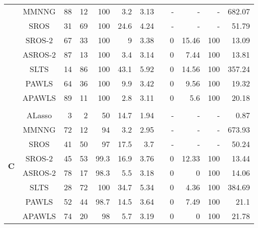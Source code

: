 \documentclass{article}\usepackage[]{graphicx}\usepackage[]{color}
\begin{document}
\begin{table}[thp]
\begin{center}
\begin{tabular}{ccrrrrrrrrrr}
	      & MMNNG & 88 & 12 & 100 
	      & 3.2 & 3.13 & & -& - & - & 682.07\\
	      
	      & SROS & 31 & 69 & 100 
	      & 24.6 & 4.24 & & -& - & - &  51.79\\
	      
	       & SROS-2 & 67 & 33 & 100 
	      & 9 & 3.38 & & 0 
	      & 15.46 & 100 & 13.09\\
	      
	      & ASROS-2 & 87 & 13 & 100 
	      & 3.4 & 3.14 & & 0 
	      & 7.44 & 100 & 13.81\\
	      
	      
	       & SLTS & 14 & 86 & 100 
	      & 43.1 & 5.92 & & 0 
	      & 14.56 & 100 & 357.24\\
	      
	      & PAWLS & 64 & 36 & 100 
	      & 9.9 & 3.42 & & 0 
	      & 9.56 & 100 & 19.32\\
	      
	      & APAWLS & 89 & 11 & 100 
	      & 2.8 & 3.11 & & 0 
	      & 5.6 & 100 & 20.18\\
	      \\
	        	  \multirow{8}{*}{{\bf C}}
	     	      & ALasso & 3 & 2 & 50 
	      & 14.7 & 1.94 & & -& - & - &  0.87\\
	      
	      & MMNNG & 72 & 12 & 94 
	      & 3.2 & 2.95 & & -& - & - & 673.93\\
	      
	      & SROS & 41 & 50 & 97 
	      & 17.5 & 3.7 & & -& - & - &  50.24\\
	      
	       & SROS-2 & 45 & 53 & 99.3 
	      & 16.9 & 3.76 & & 0 
	      & 12.33 & 100 & 13.44\\
	      
	      & ASROS-2 & 78 & 17 & 98.3 
	      & 5.5 & 3.18 & & 0 
	      & 0 & 100 & 14.06\\
	      
	      
	       & SLTS & 28 & 72 & 100 
	      & 34.7 & 5.34 & & 0 
	      & 4.36 & 100 & 384.69\\
	      
	      & PAWLS & 52 & 44 & 98.7 
	      & 14.5 & 3.64 & & 0 
	      & 7.49 & 100 & 21.1\\
	      
	      & APAWLS & 74 & 20 & 98 
	      & 5.7 & 3.19 & & 0 
	      & 0 & 100 & 21.78\\
	      

\end{tabular}
\end{center}
\end{table}
\end{document}
